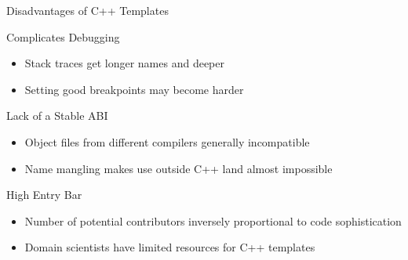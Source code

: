 
\begin{frame}{Disadvantages of C++ Templates}

 \begin{block}{Complicates Debugging}
  \begin{itemize}
   \item Stack traces get longer names and deeper
   \item Setting good breakpoints may become harder
  \end{itemize}
 \end{block}

 \begin{block}{Lack of a Stable ABI}
  \begin{itemize}
   \item Object files from different compilers generally incompatible
   \item Name mangling makes use outside C++ land almost impossible
  \end{itemize}
 \end{block}

 \begin{block}{High Entry Bar}
  \begin{itemize}
   \item Number of potential contributors inversely proportional to code sophistication
   \item Domain scientists have limited resources for C++ templates
  \end{itemize}
 \end{block}


\end{frame}

